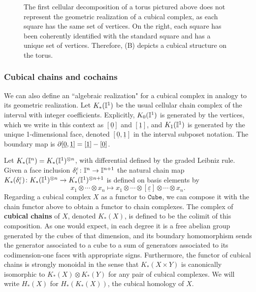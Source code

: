 \begin{figure}
	
	\caption{The first cellular decomposition of a torus pictured above does not represent the geometric realization of a cubical complex, as each square has the same set of vertices.
		On the right, each square has been coherently identified with the standard square and has a unique set of vertices.
		Therefore, (B) depicts a cubical structure on the torus.}
	\label{F: cubical structure}
\end{figure}

\subsubsection{Cubical chains and cochains}\label{S: cubical cochains}

We can also define an ``algebraic realization" for a cubical complex in analogy to its geometric realization.
Let $K_*(\mathbb{I}^1)$ be the usual cellular chain complex of the interval with integer coefficients.
Explicitly, $K_0(\mathbb{I}^1)$ is generated by the vertices, which we write in this context as $[\underline{0}]$ and $[\underline{1}]$, and $K_1(\mathbb{I}^1)$ is generated by the unique 1-dimensional face, denoted $[\underline{0},\underline{1}]$ in the interval subposet notation.
The boundary map is $\partial [\underline{0},\underline{1}] = [\underline{1}]-[\underline{0}]$.

Let $K_*(\mathbb{I}^n) = K_*(\mathbb{I}^1)^{ \otimes n}$, with differential defined by the graded Leibniz rule.
Given a face inclusion $\delta_i^{\varepsilon} \colon \mathbb{I}^n \to \mathbb{I}^{n+1}$ the natural chain map $K_*(\delta_i^{\varepsilon}) \colon K_*(\mathbb{I}^1)^{ \otimes n} \to K_*(\mathbb{I}^1)^{ \otimes n+1}$ is defined on basis elements by
\begin{equation*}
	x_1 \otimes \cdots \otimes x_n \mapsto
	x_1 \otimes \cdots \otimes [\underline{\varepsilon}] \otimes \cdots \otimes x_n.
\end{equation*}
Regarding a cubical complex $X$ as a functor to $\mathtt{Cube}$, we can compose it with the chain functor above to obtain a functor to chain complexes.
The complex of \textbf{cubical chains} of $X$, denoted $K_*(X)$, is defined to be the colimit of this composition.
As one would expect, in each degree it is a free abelian group generated by the cubes of that dimension, and its boundary homomorphism sends the
generator associated to a cube to a sum of generators associated to its codimension-one faces with appropriate signs.
Furthermore, the functor of cubical chains is strongly monoidal in the sense that $K_*(X \times Y)$ is canonically isomorphic to $K_*(X) \otimes K_*(Y)$ for any pair of cubical complexes.
We will write $H_*(X)$ for $H_*(K_*(X))$, the cubical homology of $X$.

